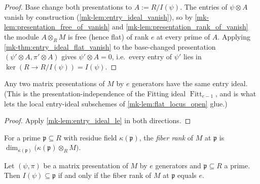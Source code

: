 \begin{proof}
  \leanok
  Base change both presentations to \(A := R / I(\psi)\).  The entries of
  \(\psi \otimes A\) vanish by construction
  (\ref{mk-lem:entry_ideal_vanish}), so by
  \ref{mk-lem:presentation_free_of_vanish} and \ref{mk-lem:presentation_rank_of_vanish}
  the module \(A \otimes_R M\) is free (hence flat) of rank \(e\) at every
  prime of \(A\).  Applying \ref{mk-thm:entry_ideal_flat_vanish} to the
  base-changed presentation \((\psi' \otimes A, \pi' \otimes A)\) gives
  \(\psi' \otimes A = 0\), i.e.\ every entry of \(\psi'\) lies in
  \(\ker(R \to R/I(\psi)) = I(\psi)\).
\end{proof}

\begin{theorem}
  \label{mk-thm:entry_ideal_presentation_independent}
  \leanok

  Any two matrix presentations of \(M\) by \(e\) generators have the same
  entry ideal.  (This is the presentation-independence of the Fitting ideal
  \(\operatorname{Fitt}_{e-1}\), and is what lets the local entry-ideal
  subschemes of \ref{mk-lem:flat_locus_open} glue.)
\end{theorem}

\begin{proof}
  \leanok
  Apply \ref{mk-lem:entry_ideal_le} in both directions.
\end{proof}

\begin{definition}
  \label{mk-def:fiber_rank}
  \leanok

  For a prime \(\mathfrak p \subseteq R\) with residue field
  \(\kappa(\mathfrak p)\), the \emph{fiber rank} of \(M\) at
  \(\mathfrak p\) is
  \(\dim_{\kappa(\mathfrak p)} \bigl(\kappa(\mathfrak p) \otimes_R M\bigr)\).
\end{definition}

\begin{theorem}
  \label{mk-thm:entry_ideal_prime_iff}
  \leanok

  Let \((\psi, \pi)\) be a matrix presentation of \(M\) by \(e\) generators
  and \(\mathfrak p \subseteq R\) a prime.  Then
  \(I(\psi) \subseteq \mathfrak p\) if and only if the fiber rank of \(M\)
  at \(\mathfrak p\) equals \(e\).
\end{theorem}

